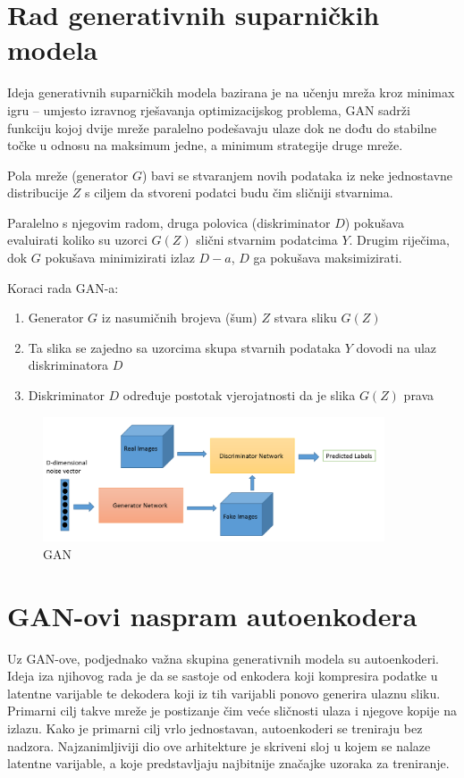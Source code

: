 \documentclass[lmodern, utf8, seminar]{fer}
\begin{document}
\section{Rad generativnih suparničkih modela}
Ideja generativnih suparničkih modela bazirana je na učenju mreža kroz minimax igru -- umjesto izravnog rješavanja optimizacijskog problema, GAN sadrži funkciju kojoj dvije mreže paralelno podešavaju ulaze dok ne dođu do stabilne točke u odnosu na maksimum jedne, a minimum strategije druge mreže. 
\newline

Pola mreže (generator $G$) bavi se stvaranjem novih podataka iz neke jednostavne distribucije $Z$ s ciljem da stvoreni podatci budu čim sličniji stvarnima. 

Paralelno s njegovim radom, druga polovica (diskriminator $D$) pokušava evaluirati koliko su uzorci $G(Z)$ slični stvarnim podatcima $Y$. Drugim riječima, dok $G$ pokušava minimizirati izlaz $D-a$, $D$ ga pokušava maksimizirati.
\newline
\newpage

Koraci rada GAN-a:
\begin{enumerate} 
\item Generator $G$ iz nasumičnih brojeva (šum) $Z$ stvara sliku $G(Z)$
\item Ta slika se zajedno sa uzorcima skupa stvarnih podataka $Y$ dovodi na ulaz diskriminatora $D$
\item Diskriminator $D$ određuje postotak vjerojatnosti da je slika $G(Z)$ prava
\end{enumerate}

\begin{figure}[H]
    \centering
    \includegraphics[width=0.9\textwidth]{gan_schema}
    \caption{GAN \cite{goodfellow2016nips}}
    \label{fig:gan_schema}
\end{figure}

\newpage
\section{GAN-ovi naspram autoenkodera}
Uz GAN-ove, podjednako važna skupina generativnih modela su autoenkoderi. Ideja iza njihovog rada je da se sastoje od enkodera koji kompresira podatke u latentne varijable te dekodera koji iz tih varijabli ponovo generira ulaznu sliku. Primarni cilj takve mreže je postizanje čim veće sličnosti ulaza i njegove kopije na izlazu. Kako je primarni cilj vrlo jednostavan, autoenkoderi se treniraju bez nadzora.
Najzanimljiviji dio ove arhitekture je skriveni sloj u kojem se nalaze latentne varijable, a koje predstavljaju najbitnije značajke uzoraka za treniranje.
\newline
\end{document}
